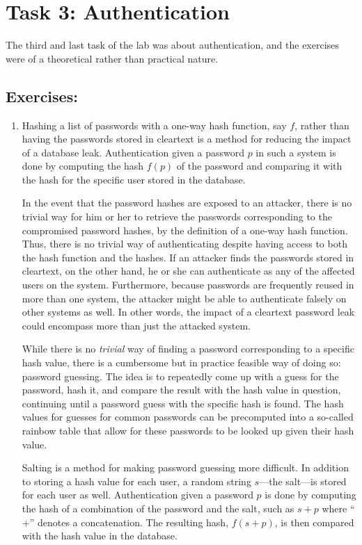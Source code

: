\section*{Task 3: Authentication}
The third and last task of the lab was about authentication, and the exercises were of a theoretical rather than practical nature.
\subsection*{Exercises:}
\begin{enumerate}
\item %
Hashing a list of passwords with a one-way hash function, say $f$, rather than having the passwords stored in cleartext is a method for reducing the impact of a database leak. Authentication given a password $p$ in such a system is done by computing the hash $f(p)$ of the password and comparing it with the hash for the specific user stored in the database.

In the event that the password hashes are exposed to an attacker, there is no trivial way for him or her to retrieve the passwords corresponding to the compromised password hashes, by the definition of a one-way hash function. Thus, there is no trivial way of authenticating despite having access to both the hash function and the hashes. If an attacker finds the passwords stored in cleartext, on the other hand, he or she can authenticate as any of the affected users on the system. Furthermore, because passwords are frequently reused in more than one system, the attacker might be able to authenticate falsely on other systems as well. In other words, the impact of a cleartext password leak could encompass more than just the attacked system.

While there is no \emph{trivial} way of finding a password corresponding to a specific hash value, there is a cumbersome but in practice feasible way of doing so: password guessing\cite{book:passwordGuessing}. The idea is to repeatedly come up with a guess for the password, hash it, and compare the result with the hash value in question, continuing until a password guess with the specific hash is found. The hash values for guesses for common passwords can be precomputed into a so-called rainbow table\cite{website:wikipedia_rainbowtable} that allow for these passwords to be looked up given their hash value.

Salting is a method for making password guessing more difficult. In addition to storing a hash value for each user, a random string $s$---the salt---is stored for each user as well. Authentication given a password $p$ is done by computing the hash of a combination of the password and the salt, such as $s + p$ where ``$+$'' denotes a concatenation. The resulting hash, $f(s + p)$, is then compared with the hash value in the database.


\end{enumerate}
